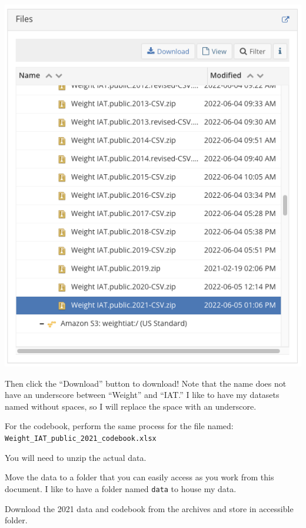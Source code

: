 \documentclass[
  letterpaper,
  DIV=11,
  numbers=noendperiod]{scrartcl}
\begin{document}
\includegraphics{images/data_access_3.png}

Then click the ``Download'' button to download! Note that the name does
not have an underscore between ``Weight'' and ``IAT.'' I like to have my
datasets named without spaces, so I will replace the space with an
underscore.

For the codebook, perform the same process for the file named:
\texttt{Weight\_IAT\_public\_2021\_codebook.xlsx}

You will need to unzip the actual data.

Move the data to a folder that you can easily access as you work from
this document. I like to have a folder named \texttt{data} to house my
data.

\begin{tcolorbox}[enhanced jigsaw, colframe=quarto-callout-important-color-frame, arc=.35mm, colbacktitle=quarto-callout-important-color!10!white, bottomrule=.15mm, left=2mm, breakable, opacitybacktitle=0.6, rightrule=.15mm, opacityback=0, bottomtitle=1mm, coltitle=black, leftrule=.75mm, toptitle=1mm, titlerule=0mm, title=\textcolor{quarto-callout-important-color}{\faExclamation}\hspace{0.5em}{Task Summary}, toprule=.15mm, colback=white]

Download the 2021 data and codebook from the archives and store in
accessible folder.

\end{tcolorbox}
\end{document}
